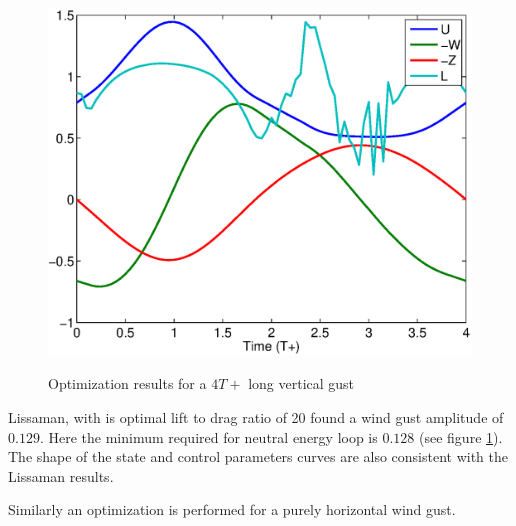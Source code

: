 \begin{figure}[ht]
  \begin{center}	
    \scalebox{0.8}
    {\includegraphics{./Figures/Windtype=1_Tg=4_Wg=0p129_quad_G=20.eps}}
  \end{center}
  \caption{Optimization results for a $4T+$ long vertical gust}
  \label{fig:Validation_optimization}
\end{figure}

\FloatBarrier

Lissaman, with is optimal lift to drag ratio of 20 found a wind gust amplitude of $0.129$. 
Here the minimum required for neutral energy loop is $0.128$ (see figure \ref{fig:Validation_optimization}).
The shape of the state and control parameters curves are also consistent with the Lissaman results.

\par Similarly an optimization is performed for a purely horizontal wind gust.

